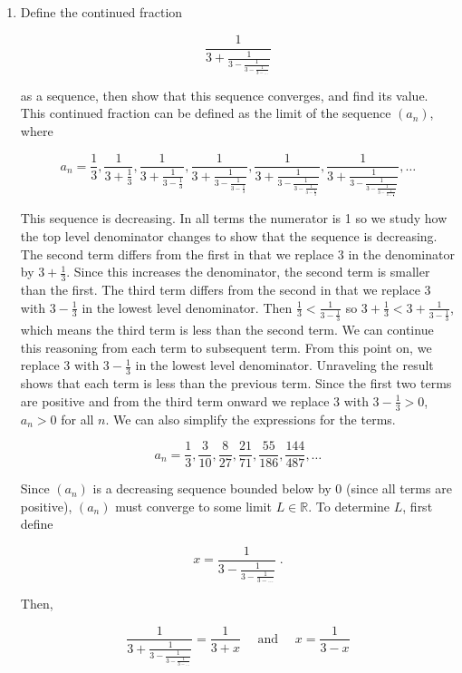 \documentclass[a4paper]{article}
\begin{document}
\begin{enumerate}
\newpage
\item

Define the continued fraction

$$
\frac{1}{3 + 
	\frac{1}{3-
		\frac{1}{3 - 
			\frac{1}{3 - \dots
			}
		}
	}
}
$$

as a sequence, then show that this sequence converges, and find its value. \\

This continued fraction can be defined as the limit of the sequence $(a_n)$, where

$$
a_n = 
\frac{1}{3}, \frac{1}{3+\frac{1}{3}},
\frac{1}{3+\frac{1}{3-\frac{1}{3}}},
\frac{1}{3+\frac{1}{3-\frac{1}{3-\frac{1}{3}}}},
\frac{1}{3+\frac{1}{3-\frac{1}{3-\frac{1}{3-\frac{1}{3}}}}},
\frac{1}{3+\frac{1}{3-\frac{1}{3-\frac{1}{3-\frac{1}{3-\frac{1}{3}}}}}},
\dots
$$

This sequence is decreasing. In all terms the numerator is 1 so we study how the top level denominator changes to show that the sequence is decreasing. The second term differs from the first in that we replace 3 in the denominator by $3 + \frac{1}{3}$. Since this increases the denominator, the second term is smaller than the first. The third term differs from the second in that we replace $3$ with $3 - \frac{1}{3}$ in the lowest level denominator. Then $\frac{1}{3} < \frac{1}{3-\frac{1}{3}}$ so $3 + \frac{1}{3} < 3 + \frac{1}{3-\frac{1}{3}}$, which means the third term is less than the second term. We can continue this reasoning from each term to subsequent term. From this point on, we replace $3$ with $3 - \frac{1}{3}$ in the lowest level denominator. Unraveling the result shows that each term is less than the previous term. Since the first two terms are positive and from the third term onward we replace $3$ with $3 - \frac{1}{3} > 0$, $a_n > 0$ for all $n$. We can also simplify the expressions for the terms.

$$a_n = 
\frac{1}{3}, \frac{3}{10}, \frac{8}{27}, \frac{21}{71},
\frac{55}{186}, \frac{144}{487}, \dots
$$

Since $(a_n)$ is a decreasing sequence bounded below by 0 (since all terms are positive), $(a_n)$ must converge to some limit $L \in \mathbb{R}$. To determine $L$, first define

$$
x = \frac{1}{3 - \frac{1}{3 - \frac{1}{3- \dots}}} \;.
$$

Then,

$$
\frac{1}{3 + 
	\frac{1}{3-
		\frac{1}{3 - 
			\frac{1}{3 - \dots
			}
		}
	}
}
= 
\frac{1}{3+x}
\quad \text{ and } \quad
x = \frac{1}{3-x}
$$


\end{enumerate}
\end{document}
